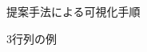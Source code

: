\documentclass[syuuron]{kuee}
\begin{document}
		\begin{figure}
			\begin{center}
			\end{center}
			\caption{提案手法による可視化手順}
	  		\label{fig:met1}
		\end{figure}
		\begin{figure}
			\begin{center}
			\end{center}
			\caption{3行列の例}
	  		\label{fig:met2}
		\end{figure}
\end{document}
